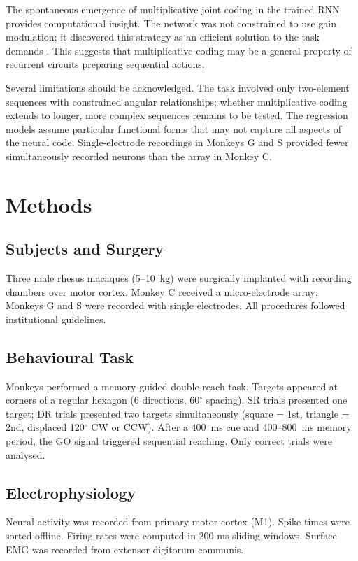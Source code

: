 \documentclass[11pt]{article}
\begin{document}
The spontaneous emergence of multiplicative joint coding in the trained RNN provides computational insight. The network was not constrained to use gain modulation; it discovered this strategy as an efficient solution to the task demands \citep{sussillo2015neural, mante2013context}. This suggests that multiplicative coding may be a general property of recurrent circuits preparing sequential actions.

Several limitations should be acknowledged. The task involved only two-element sequences with constrained angular relationships; whether multiplicative coding extends to longer, more complex sequences remains to be tested. The regression models assume particular functional forms that may not capture all aspects of the neural code. Single-electrode recordings in Monkeys G and S provided fewer simultaneously recorded neurons than the array in Monkey C.

\section{Methods}

\subsection{Subjects and Surgery}
Three male rhesus macaques (5--10~kg) were surgically implanted with recording chambers over motor cortex. Monkey C received a micro-electrode array; Monkeys G and S were recorded with single electrodes. All procedures followed institutional guidelines.

\subsection{Behavioural Task}
Monkeys performed a memory-guided double-reach task. Targets appeared at corners of a regular hexagon (6 directions, 60$^\circ$ spacing). SR trials presented one target; DR trials presented two targets simultaneously (square = 1st, triangle = 2nd, displaced 120$^\circ$ CW or CCW). After a 400~ms cue and 400--800~ms memory period, the GO signal triggered sequential reaching. Only correct trials were analysed.

\subsection{Electrophysiology}
Neural activity was recorded from primary motor cortex (M1). Spike times were sorted offline. Firing rates were computed in 200-ms sliding windows. Surface EMG was recorded from extensor digitorum communis.
\end{document}

